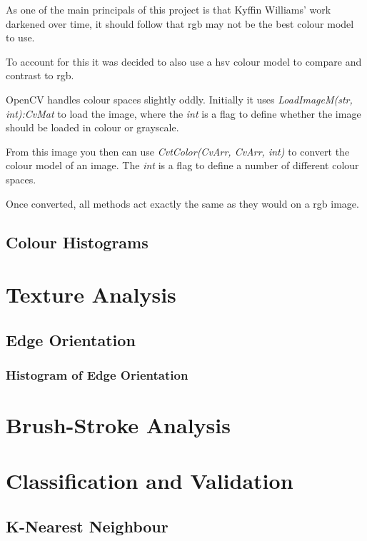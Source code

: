 As one of the main principals of this project is that Kyffin Williams' work darkened over time, it
should follow that \gls{rgb} may not be the best colour model to use.

To account for this it was decided to also use a \gls{hsv} colour model to compare and contrast to
\gls{rgb}.

OpenCV handles colour spaces slightly oddly. Initially it uses \textit{LoadImageM(str, int):CvMat}
to load the image, where the \textit{int} is a flag to define whether the image should be loaded
in colour or grayscale.

From this image you then can use \textit{CvtColor(CvArr, CvArr, int)} to convert the colour model
of an image. The \textit{int} is a flag to define a number of different colour spaces.

Once converted, all methods act exactly the same as they would on a \gls{rgb} image.


\subsection{Colour Histograms}



\section{Texture Analysis}

\subsection{Edge Orientation}
\subsubsection{Histogram of Edge Orientation}


\section{Brush-Stroke Analysis}


\section{Classification and Validation}

\subsection{K-Nearest Neighbour}

